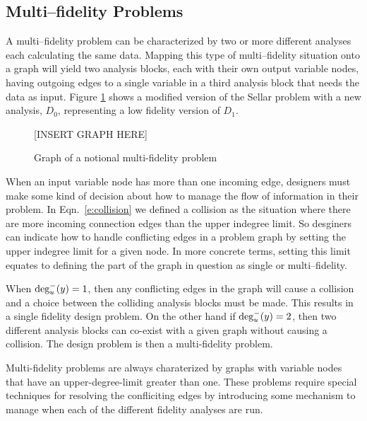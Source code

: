 \subsection{Multi--fidelity Problems}
  \label{ss:multi-fideliy problems}
  A multi--fidelity problem can be characterized by two or more different analyses 
  each calculating the same data. Mapping this type of multi--fidelity situation 
  onto a graph will yield two analysis blocks, each with their own output 
  variable nodes, having outgoing edges to a single variable in a third analysis 
  block that needs the data as input. Figure \ref{f:collision_example} shows 
  a modified version of the Sellar problem with a new analysis, $D_0$, representing a 
  low fidelity version of $D_1$. 

  \begin{figure}
    \begin{center}
    [INSERT GRAPH HERE]
    \caption{Graph of a notional multi-fidelity problem \label{f:collision_example}}
  \end{center}
  \end{figure}

  When an input variable node has more than one incoming edge, designers must make
  some kind of decision about how to manage the flow of information in their problem. 
  In Eqn.~\ref{e:collision} we defined a collision as the situation where
  there are more incoming connection edges than the upper indegree limit. So desginers can
  indicate how to handle conflicting edges in a problem graph by setting the upper indegree limit
  for a given node. In more concrete terms, setting this limit equates to defining 
  the part of the graph in question as single or multi--fidelity. 

  When $\textrm{deg}_u^-(y)=1$, then any conflicting edges in the graph will cause a collision
  and a choice between the colliding analysis blocks must be made. This results in a 
  single fidelity design problem. On the other hand if $\textrm{deg}_u^-(y)=2$, then two 
  different analysis blocks can co-exist with a given graph without causing a 
  collision. The design problem is then a multi-fidelity problem.

  Multi-fidelity problems are always charaterized by graphs with variable 
  nodes that have an upper-degree-limit greater than one. These problems require 
  special techniques for resolving the confliciting edges by introducing some mechanism
  to manage when each of the different fidelity analyses are 
  run\cite{march2012provably,alexandrov2001approximation,Huang_Allen_Notz_Miller_2006}.



